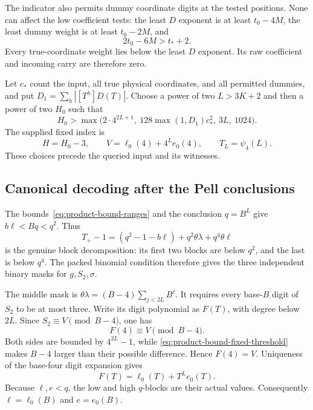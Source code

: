 The indicator also permits dummy coordinate digits at the tested
positions. None can affect the low coefficient tests: the least
$D$ exponent is at least $t_0-4M$, the least dummy weight is at
least $t_0-2M$, and
\begin{equation}\label{eq:product-bound-dummies}
 2t_0-6M>t_*+2.
\end{equation}
Every true-coordinate weight lies below the least $D$ exponent.
Its raw coefficient and incoming carry are therefore zero.

Let $c_*$ count the input, all true physical coordinates, and all
permitted dummies, and put $D_1=\sum_h|[T^h]D(T)|$. Choose a power
of two $L>3K+2$ and then a power of two $H_0$ such that
\begin{equation}\label{eq:product-bound-fixed-threshold}
 H_0>\max\bigl(
   2\cdot4^{2L+1},\ 128\max(1,D_1)c_*^2,\ 3L,\ 1024\bigr).
\end{equation}
The supplied fixed index is
\begin{equation}\label{eq:product-bound-index}
 H=H_0-3,\qquad
 V=\ell_0(4)+4^Le_0(4),\qquad T_L=\psi_4(L).
\end{equation}
These choices precede the queried input and its witnesses.

\subsection{Canonical decoding after the Pell conclusions}

The bounds~\eqref{eq:product-bound-ranges} and the conclusion $q=B^L$
give $b\ell<Bq<q^2$. Thus
\begin{equation}\label{eq:product-bound-mask-blocks}
 T_+-1=(q^2-1-b\ell)+q^2\theta\lambda+q^4\theta\ell
\end{equation}
is the genuine block decomposition: its first two blocks are below
$q^2$, and the last is below $q^4$. The packed binomial condition
therefore gives the three independent binary masks for $g,S_2,\sigma$.

The middle mask is $\theta\lambda=(B-4)\sum_{j<2L}B^j$.
It requires every base-$B$ digit of $S_2$ to be at most three.
Write its digit polynomial as $F(T)$, with degree below $2L$.
Since $S_2\equiv V\pmod{B-4}$, one has
\[
 F(4)\equiv V\pmod{B-4}.
\]
Both sides are bounded by $4^{2L}-1$, while
\eqref{eq:product-bound-fixed-threshold} makes $B-4$ larger than
their possible difference. Hence $F(4)=V$. Uniqueness of the
base-four digit expansion gives
\[
 F(T)=\ell_0(T)+T^Le_0(T).
\]
Because $\ell,e<q$, the low and high $q$-blocks are their actual
values. Consequently $\ell=\ell_0(B)$ and $e=e_0(B)$.

